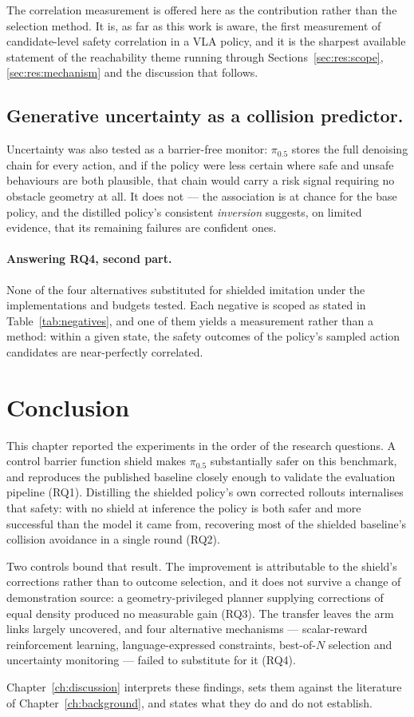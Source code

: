 The correlation measurement is offered here as the contribution rather than the selection method.
It is, as far as this work is aware, the first measurement of candidate-level safety correlation in
a VLA policy, and it is the sharpest available statement of the reachability
theme running through Sections~\ref{sec:res:scope}, \ref{sec:res:mechanism} and the discussion that
follows.

\subsection*{Generative uncertainty as a collision predictor.} Uncertainty was also tested as a barrier-free monitor: $\pi_{0.5}$ stores the full denoising chain
for every action, and if the policy were less certain where safe and unsafe behaviours are both
plausible, that chain would carry a risk signal requiring no obstacle geometry at all. It does
not --- the association is at chance for the base policy, and the distilled policy's consistent
\emph{inversion} suggests, on limited evidence, that its remaining failures are confident ones.

\paragraph{Answering RQ4, second part.}
None of the four alternatives substituted for shielded imitation under the implementations and
budgets tested. Each negative is scoped as stated in Table~\ref{tab:negatives}, and one of them
yields a measurement rather than a method: within a given state, the safety outcomes of the
policy's sampled action candidates are near-perfectly correlated.

\section{Conclusion}\label{sec:res:conclusion}

This chapter reported the experiments in the order of the research questions. A control barrier
function shield makes $\pi_{0.5}$ substantially safer on this benchmark, and reproduces the
published baseline closely enough to validate the evaluation pipeline (RQ1). Distilling the
shielded policy's own corrected rollouts internalises that safety: with no shield at inference the
policy is both safer and more successful than the model it came from, recovering most of the
shielded baseline's collision avoidance in a single round (RQ2).

Two controls bound that result. The improvement is attributable to the shield's corrections rather
than to outcome selection, and it does not survive a change of demonstration source: a
geometry-privileged planner supplying corrections of equal density produced no measurable gain
(RQ3). The transfer leaves the arm links largely uncovered, and four alternative mechanisms --- 
scalar-reward reinforcement learning, language-expressed constraints, best-of-$N$ selection and
uncertainty monitoring --- failed to substitute for it (RQ4).

Chapter~\ref{ch:discussion} interprets these findings, sets them against the literature of
Chapter~\ref{ch:background}, and states what they do and do not establish.
